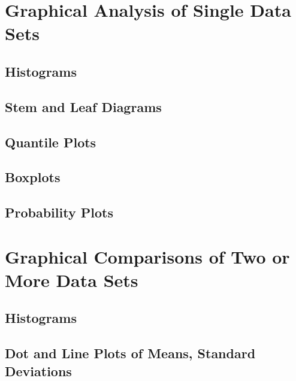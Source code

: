 \documentclass[]{book}
\begin{document}
\hypertarget{ch2-1}{%
\section{Graphical Analysis of Single Data Sets}\label{ch2-1}}

\hypertarget{histograms}{%
\subsection{Histograms}\label{histograms}}

\hypertarget{stem-and-leaf-diagrams}{%
\subsection{Stem and Leaf Diagrams}\label{stem-and-leaf-diagrams}}

\hypertarget{quantile-plots}{%
\subsection{Quantile Plots}\label{quantile-plots}}

\hypertarget{boxplots}{%
\subsection{Boxplots}\label{boxplots}}

\hypertarget{probability-plots}{%
\subsection{Probability Plots}\label{probability-plots}}

\hypertarget{ch2-2}{%
\section{Graphical Comparisons of Two or More Data Sets}\label{ch2-2}}

\hypertarget{histograms-1}{%
\subsection{Histograms}\label{histograms-1}}

\hypertarget{dot-and-line-plots-of-means-standard-deviations}{%
\subsection{Dot and Line Plots of Means, Standard Deviations}\label{dot-and-line-plots-of-means-standard-deviations}}
\end{document}
